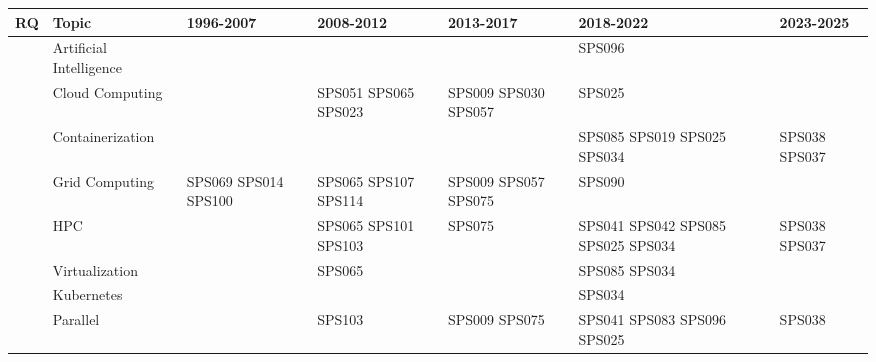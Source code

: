 \begin{table}
	{\fontsize{7}{10}\selectfont
		\setlength{\tabcolsep}{3pt}
		\begin{tabular}{>{\raggedright\arraybackslash}p{1.0cm}>{\raggedright\arraybackslash}p{3.0cm}>{\raggedright\arraybackslash}p{2.2cm}>{\raggedright\arraybackslash}p{2.2cm}>{\raggedright\arraybackslash}p{2.2cm}>{\raggedright\arraybackslash}p{2.2cm}>{\raggedright\arraybackslash}p{2.2cm}} \toprule
			\textbf{RQ}                    & \textbf{Topic}          & \textbf{1996-2007}   & \textbf{2008-2012}   & \textbf{2013-2017}   & \textbf{2018-2022}                 & \textbf{2023-2025} \\
			\midrule
			\multirow{16}{*}{\textbf{RQ1}} & Artificial Intelligence &                      &                      &                      & SPS096                             &                    \\
			                               & Cloud Computing         &                      & SPS051 SPS065 SPS023 & SPS009 SPS030 SPS057 & SPS025                             &                    \\
			                               & Containerization        &                      &                      &                      & SPS085 SPS019 SPS025 SPS034        & SPS038 SPS037      \\
			                               & Grid Computing          & SPS069 SPS014 SPS100 & SPS065 SPS107 SPS114 & SPS009 SPS057 SPS075 & SPS090                             &                    \\
			                               & HPC                     &                      & SPS065 SPS101 SPS103 & SPS075               & SPS041 SPS042 SPS085 SPS025 SPS034 & SPS038 SPS037      \\
			                               & Virtualization          &                      & SPS065               &                      & SPS085 SPS034                      &                    \\
			                               & Kubernetes              &                      &                      &                      & SPS034                             &                    \\
			                               & Parallel                &                      & SPS103               & SPS009 SPS075        & SPS041 SPS083 SPS096 SPS025        & SPS038             \\

\end{tabular}}
\end{table}
